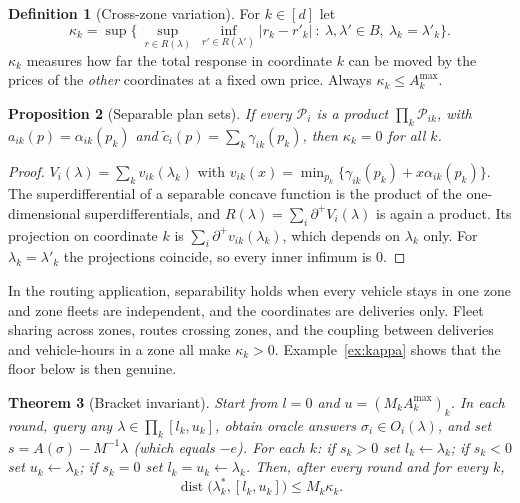 \documentclass[11pt]{article}
\newtheorem{theorem}{Theorem}
\newtheorem{proposition}[theorem]{Proposition}
\theoremstyle{definition}
\newtheorem{definition}[theorem]{Definition}
\theoremstyle{remark}
\newcommand{\cP}{\mathcal{P}}
\newcommand{\Amax}{A^{\max}}
\newcommand{\sd}{\partial^{+}}
\begin{document}
\begin{definition}[Cross-zone variation]\label{def:kappa}
For $k\in[d]$ let
\[\kappa_k=\sup\Big\{\ \sup_{r\in R(\lambda)}\ \inf_{r'\in R(\lambda')}|r_k-r'_k|\ :\ \lambda,\lambda'\in B,\ \lambda_k=\lambda'_k\Big\}.\]
$\kappa_k$ measures how far the total response in coordinate $k$ can be moved by the prices of the \emph{other} coordinates at a fixed own price. Always $\kappa_k\le\Amax_k$.
\end{definition}

\begin{proposition}[Separable plan sets]\label{prop:sep}
If every $\cP_i$ is a product $\prod_k\cP_{ik}$, with $a_{ik}(p)=\alpha_{ik}(p_k)$ and $\tilde c_i(p)=\sum_k\gamma_{ik}(p_k)$, then $\kappa_k=0$ for all $k$.
\end{proposition}
\begin{proof}
$V_i(\lambda)=\sum_kv_{ik}(\lambda_k)$ with $v_{ik}(x)=\min_{p_k}\{\gamma_{ik}(p_k)+x\alpha_{ik}(p_k)\}$. The superdifferential of a separable concave function is the product of the one-dimensional superdifferentials, and $R(\lambda)=\sum_i\sd V_i(\lambda)$ is again a product. Its projection on coordinate $k$ is $\sum_i\sd v_{ik}(\lambda_k)$, which depends on $\lambda_k$ only. For $\lambda_k=\lambda'_k$ the projections coincide, so every inner infimum is $0$.
\end{proof}

In the routing application, separability holds when every vehicle stays in one zone and zone fleets are independent, and the coordinates are deliveries only. Fleet sharing across zones, routes crossing zones, and the coupling between deliveries and vehicle-hours in a zone all make $\kappa_k>0$. Example~\ref{ex:kappa} shows that the floor below is then genuine.

\begin{theorem}[Bracket invariant]\label{thm:bracket}
Start from $l=0$ and $u=(M_k\Amax_k)_k$. In each round, query any $\lambda\in\prod_k[l_k,u_k]$, obtain oracle answers $\sigma_i\in O_i(\lambda)$, and set $s=A(\sigma)-M^{-1}\lambda$ (which equals $-e$). For each $k$: if $s_k>0$ set $l_k\gets\lambda_k$; if $s_k<0$ set $u_k\gets\lambda_k$; if $s_k=0$ set $l_k=u_k\gets\lambda_k$. Then, after every round and for every $k$,
\[\operatorname{dist}\big(\lambda^*_k,[l_k,u_k]\big)\le M_k\kappa_k .\]
\end{theorem}
\end{document}
